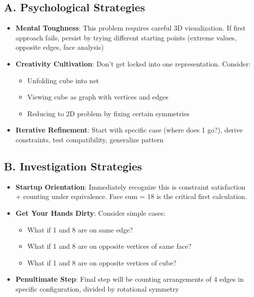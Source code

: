 \documentclass[]{article}
\begin{document}
\begin{strategicbox}
\subsection*{A. Psychological Strategies}
\begin{itemize}[leftmargin=*]
    \item \textbf{Mental Toughness}: This problem requires careful 3D visualization. If first approach fails, persist by trying different starting points (extreme values, opposite edges, face analysis)
    
    \item \textbf{Creativity Cultivation}: Don't get locked into one representation. Consider:
    \begin{itemize}
        \item Unfolding cube into net
        \item Viewing cube as graph with vertices and edges
        \item Reducing to 2D problem by fixing certain symmetries
    \end{itemize}
    
    \item \textbf{Iterative Refinement}: Start with specific case (where does 1 go?), derive constraints, test compatibility, generalize pattern
\end{itemize}

\subsection*{B. Investigation Strategies}
\begin{itemize}[leftmargin=*]
    \item \textbf{Startup Orientation}: Immediately recognize this is constraint satisfaction + counting under equivalence. Face sum = 18 is the critical first calculation.
    
    \item \textbf{Get Your Hands Dirty}: Consider simple cases:
    \begin{itemize}
        \item What if 1 and 8 are on same edge?
        \item What if 1 and 8 are on opposite vertices of same face?
        \item What if 1 and 8 are on opposite vertices of cube?
    \end{itemize}
    
    \item \textbf{Penultimate Step}: Final step will be counting arrangements of 4 edges in specific configuration, divided by rotational symmetry
    

\end{itemize}
\end{strategicbox}
\end{document}
